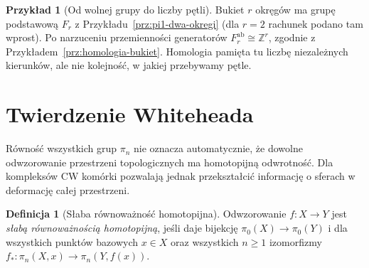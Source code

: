 \documentclass[11pt,a4paper,oneside]{report}
\newcommand{\Z}{\mathbb{Z}}
\theoremstyle{plain}
\theoremstyle{definition}
\newtheorem{definicja}[twierdzenie]{Definicja}
\newtheorem{przyklad}[twierdzenie]{Przykład}
\theoremstyle{remark}
\begin{document}
\begin{przyklad}[Od wolnej grupy do liczby pętli]
Bukiet $r$ okręgów ma
grupę podstawową
$F_r$ z
Przykładu~\ref{prz:pi1-dwa-okregi}
(dla $r=2$ rachunek
podano tam wprost).
Po narzuceniu
przemienności generatorów
$F_r^{\mathrm{ab}}\cong\Z^r$,
zgodnie z
Przykładem~\ref{prz:homologia-bukiet}.
Homologia pamięta tu
liczbę niezależnych
kierunków, ale nie
kolejność, w jakiej
przebywamy pętle.
\end{przyklad}

\section{Twierdzenie Whiteheada}
\label{sec:whitehead}

Równość wszystkich grup $\pi_n$
nie oznacza automatycznie, że
dowolne odwzorowanie przestrzeni
topologicznych ma homotopijną
odwrotność. Dla kompleksów CW
komórki pozwalają jednak
przekształcić informację
o sferach w deformację
całej przestrzeni.

\begin{definicja}[Słaba równoważność homotopijna]
\label{def:slaba-rownowaznosc}
Odwzorowanie $f:X\to Y$ jest
\emph{słabą równoważnością
homotopijną}, jeśli daje
bijekcję $\pi_0(X)\to\pi_0(Y)$
i dla wszystkich punktów
bazowych $x\in X$ oraz
wszystkich $n\geq1$
izomorfizmy
$f_*:\pi_n(X,x)\to
\pi_n(Y,f(x))$.
\end{definicja}
\end{document}
